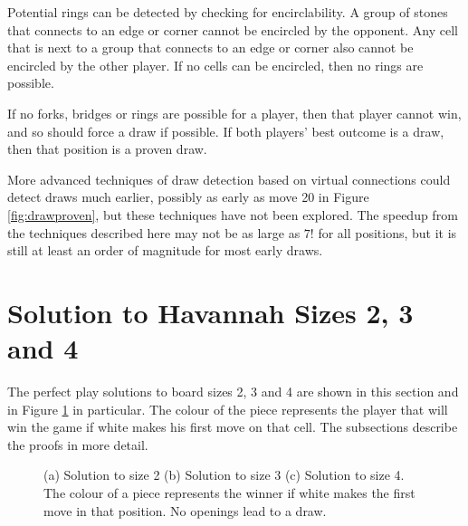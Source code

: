 Potential rings can be detected by checking for encirclability. A group of stones that connects to an edge or corner cannot be encircled by the opponent. Any cell that is next to a group that connects to an edge or corner also cannot be encircled by the other player. If no cells can be encircled, then no rings are possible.

If no forks, bridges or rings are possible for a player, then that player cannot win, and so should force a draw if possible. If both players' best outcome is a draw, then that position is a proven draw.

More advanced techniques of draw detection based on virtual connections could detect draws much earlier, possibly as early as move 20 in Figure \ref{fig:drawproven}, but these techniques have not been explored. The speedup from the techniques described here may not be as large as $7!$ for all positions, but it is still at least an order of magnitude for most early draws.


\section{Solution to Havannah Sizes 2, 3 and 4}

The perfect play solutions to board sizes 2, 3 and 4 are shown in this section and in Figure \ref{fig:solutionboard} in particular. The colour of the piece represents the player that will win the game if white makes his first move on that cell. The subsections describe the proofs in more detail.

\begin{figure}[tb]
\centering
\caption[Solution to Board Sizes 2, 3 and 4]{(a) Solution to size 2 (b) Solution to size 3 (c) Solution to size 4. The colour of a piece represents the winner if white makes the first move in that position. No openings lead to a draw.}
\label{fig:solutionboard}
\end{figure}


